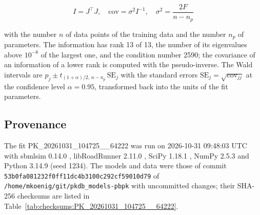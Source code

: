 \begin{equation}
I = J^\top J, \quad \mathrm{cov} = \sigma^2 I^{-1}, \quad \sigma^2 = \frac{2 F}{n - n_p}
\end{equation}

with the number $n$ of data points of the training data and the number $n_p$ of parameters. The information has rank 13 of 13, the number of its eigenvalues above $10^{-8}$ of the largest one, and the condition number 2590; the covariance of an information of a lower rank is computed with the pseudo-inverse. The Wald intervals are $\hat{p}_j \pm t_{(1+\alpha)/2,\, n-n_p}\, \mathrm{SE}_j$ with the standard errors $\mathrm{SE}_j = \sqrt{\mathrm{cov}_{jj}}$ at the confidence level $\alpha = 0.95$, transformed back into the units of the fit parameters.

\subsection{Provenance}

The fit PK\_20261031\_104725\_\_64222 was run on 2026-10-31 09:48:03 UTC with sbmlsim 0.14.0 \cite{Koenig2026_sbmlsim}, libRoadRunner 2.11.0 \cite{Welsh2023}, SciPy 1.18.1 \cite{Virtanen2020}, NumPy 2.5.3 \cite{Harris2020} and Python 3.14.9 (seed 1234). The models and data were those of commit \texttt{53b0fa081232f0ff11dc4b3100c292cf59010d79} of \texttt{/home/mkoenig/git/pkdb\_models-pbpk} with uncommitted changes; their SHA-256 checksums are listed in Table~\ref{tab:checksums:PK_20261031_104725__64222}.

